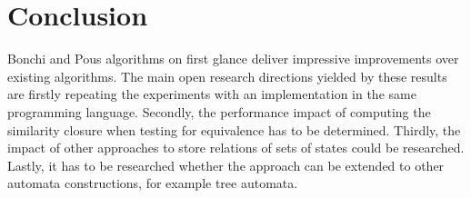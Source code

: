 \section{Conclusion}

Bonchi and Pous algorithms on first glance deliver impressive improvements over
  existing algorithms.
The main open research directions yielded by these results are firstly
  repeating the experiments with an implementation in the same programming
  language.
Secondly, the performance impact of computing the similarity closure when testing
  for equivalence has to be determined.
Thirdly, the impact of other approaches to store relations of sets of states
  could be researched.
Lastly, it has to be researched whether the approach can be extended to
other automata constructions, for example tree automata.
